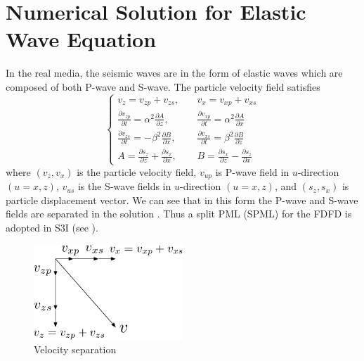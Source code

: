 \documentclass[11pt,titlepage]{article}
\theoremstyle{plain}
\theoremstyle{definition}
\theoremstyle{remark}
\numberwithin{equation}{section}
\begin{document}
\section{Numerical Solution for Elastic Wave Equation}
In the real media, the seismic waves are in the form of elastic waves which are composed of both P-wave and S-wave. The particle velocity field satisfies 
\begin{equation}
    \left\{
    \begin{aligned}
    v_z=v_{zp}+v_{zs}, \quad &v_x=v_{xp}+v_{xs}\\
    \frac{\partial v_{zp}}{\partial t}=\alpha^2 \frac{\partial A}{\partial z}, \quad &\frac{\partial v_{xp}}{\partial t}=\alpha^2 \frac{\partial A}{\partial x}\\
    \frac{\partial v_{zs}}{\partial t}=-\beta^2 \frac{\partial B}{\partial x}, \quad &\frac{\partial v_{xs}}{\partial t}=\beta^2 \frac{\partial B}{\partial z}\\
    A=\frac{\partial s_z}{\partial z}+\frac{\partial s_x}{\partial x}, \quad &B=\frac{\partial s_x}{\partial z}-\frac{\partial s_z}{\partial x}
    \end{aligned}
    \right.
    \end{equation}
  where $(v_z, v_x)$ is the particle velocity field, $v_{up}$ is P-wave field in $u$-direction $(u=x, z)$, $v_{us}$ is the S-wave fields in $u$-direction $(u=x, z)$, and $(s_z, s_x)$ is particle displacement vector. We can see that in this form the P-wave and S-wave fields are separated in the solution \cite{Chen:2014aa}. Thus a split PML (SPML) for the FDFD is adopted in S3I (see ).
    
\begin{figure}[htbp]
\centering
\includegraphics[width=0.5\textwidth]{Fig/EWCoordinates.pdf}
\caption{Velocity separation}
\end{figure}
\end{document}
